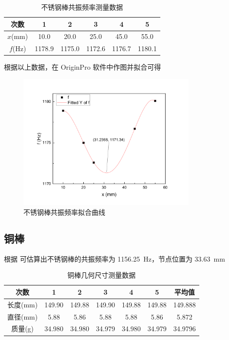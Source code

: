 \documentclass[a4paper,utf8]{article}
\begin{document}
\begin{table}[!ht]
    \caption{不锈钢棒共振频率测量数据}\label{tab:steelFreq}
    \begin{tabular}{c *{5}{S[table-format=4.1]}} \toprule
        次数 & {1} & {2} & {3} & {4} & {5} \\ \midrule
        $x$(\unit{\mm}) & 10.0 & 20.0 & 25.0 & 45.0 & 55.0 \\ 
        $f$(\unit{\Hz}) & 1178.9 & 1175.0 & 1172.6 & 1176.7 & 1180.1 \\\bottomrule
    \end{tabular}
\end{table}
根据以上数据，在 OriginPro 软件中作图并拟合可得
\begin{figure}[!ht]
    \caption{不锈钢棒共振频率拟合曲线}
    \includegraphics[width=0.8\textwidth]{steelFreq.pdf}
\end{figure}

\subsection{铜棒}
根据 可估算出不锈钢棒的共振频率为 \SI{1156.25}{\Hz}，节点位置为 \SI{33.63}{\mm}
\begin{table}[!ht]
    \caption{铜棒几何尺寸测量数据}\label{tab:copperSize}
    \begin{tabular}{c *{5}{S[table-format=3.3]} S[table-format=3.4]} \toprule
        次数 & {1} & {2} & {3} & {4} & {5} & {平均值} \\ \midrule
        长度(\unit{\mm}) & 149.90 & 149.88 & 149.90 & 149.88 & 149.88 & 149.888 \\ 
        直径(\unit{\mm}) & 5.88 & 5.86 & 5.88 & 5.88 & 5.86 & 5.872 \\ 
        质量(\unit{\g}) & 34.980 & 34.980 & 34.979 & 34.980 & 34.979 & 34.9796 \\ \bottomrule
    \end{tabular}
\end{table}
\end{document}
